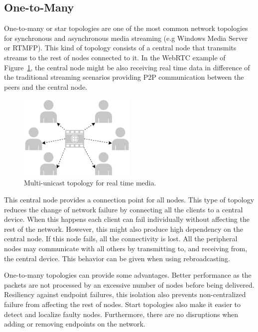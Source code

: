 \subsection{One-to-Many}

One-to-many or star topologies are one of the most common network topologies for synchronous and asynchronous media streaming (e.g Windows Media Server or RTMFP). This kind of topology consists of a central node that transmits streams to the rest of nodes connected to it. In the WebRTC example of Figure~\ref{fig:starExample}, the central node might be also receiving real time data in difference of the traditional streaming scenarios providing P2P communication between the peers and the central node.

 \begin{figure}[h]
  \centering
    \includegraphics[width=0.5\textwidth]{./figures/star.pdf}
      \caption[Multi-unicast topology for real time media]{Multi-unicast topology for real time media.}
	\label{fig:starExample}
\end{figure}

This central node provides a connection point for all nodes. This type of topology reduces the change of network failure by connecting all the clients to a central device. When this happens each client can fail individually without affecting the rest of the network. However, this might also produce high dependency on the central node. If this node fails, all the connectivity is lost. All the peripheral nodes may communicate with all others by transmitting to, and receiving from, the central device. This behavior can be given when using rebroadcasting.

One-to-many topologies can provide some advantages. Better performance as the packets are not processed by an excessive number of nodes before being delivered. Resiliency against endpoint failures, this isolation also prevents non-centralized failure from affecting the rest of nodes. Start topologies also make it easier to detect and localize faulty nodes. Furthermore, there are no disruptions when adding or removing endpoints on the network.

